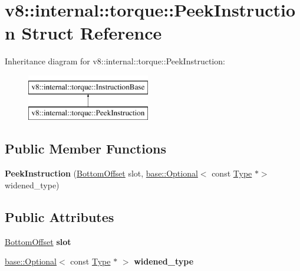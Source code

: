 \hypertarget{structv8_1_1internal_1_1torque_1_1PeekInstruction}{}\section{v8\+:\+:internal\+:\+:torque\+:\+:Peek\+Instruction Struct Reference}
\label{structv8_1_1internal_1_1torque_1_1PeekInstruction}
Inheritance diagram for v8\+:\+:internal\+:\+:torque\+:\+:Peek\+Instruction\+:\begin{figure}[H]
\begin{center}
\leavevmode
\includegraphics[height=2.000000cm]{structv8_1_1internal_1_1torque_1_1PeekInstruction}
\end{center}
\end{figure}
\subsection*{Public Member Functions}
\begin{DoxyCompactItemize}
\item 
\mbox{\label{structv8_1_1internal_1_1torque_1_1PeekInstruction_ab2e6efe80b91495d8fe96cb8ade5e93c}} 
{\bfseries Peek\+Instruction} (\mbox{\hyperlink{structv8_1_1internal_1_1torque_1_1BottomOffset}{Bottom\+Offset}} slot, \mbox{\hyperlink{classv8_1_1base_1_1Optional}{base\+::\+Optional}}$<$ const \mbox{\hyperlink{classv8_1_1internal_1_1torque_1_1Type}{Type}} $\ast$$>$ widened\+\_\+type)
\end{DoxyCompactItemize}
\subsection*{Public Attributes}
\begin{DoxyCompactItemize}
\item 
\mbox{\label{structv8_1_1internal_1_1torque_1_1PeekInstruction_a6a14d3cf26d8b644393baee12925f44c}} 
\mbox{\hyperlink{structv8_1_1internal_1_1torque_1_1BottomOffset}{Bottom\+Offset}} {\bfseries slot}
\item 
\mbox{\label{structv8_1_1internal_1_1torque_1_1PeekInstruction_a0c435c74a40d97d2d68a1120fd92f86c}} 
\mbox{\hyperlink{classv8_1_1base_1_1Optional}{base\+::\+Optional}}$<$ const \mbox{\hyperlink{classv8_1_1internal_1_1torque_1_1Type}{Type}} $\ast$ $>$ {\bfseries widened\+\_\+type}
\end{DoxyCompactItemize}



